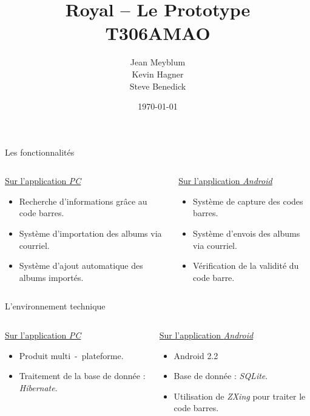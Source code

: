 \documentclass{beamer}
\title{Royal -- Le Prototype\\ T306AMAO}
\author[Jean, Kevin \& Steve]{Jean Meyblum \\ Kevin Hagner \\ Steve Benedick}
\institute{IUT Robert Schuman}
\date{\today}
\begin{document}
\begin{frame}
\titlepage
\end{frame} 

\begin{frame}{Les fonctionnalités}
\begin{columns}
\begin{column}[c]{5cm}
\underline{Sur l'application \emph{PC}}
\pause
\begin{itemize}
\pause \item Recherche d'informations grâce au code barres.
\pause \item Système d'importation des albums via courriel. 
\pause \item Système d'ajout automatique des albums importés.  
\end{itemize}
\end{column}

\begin{column}[c]{5cm}
\pause
\underline{Sur l'application \emph{Android}}
\begin{itemize}
\pause \item Système de capture des codes barres. 
\pause \item Système d'envois des albums via courriel.
\pause \item Vérification de la validité du code barre.
\end{itemize}

\end{column}
\end{columns}

\end{frame}

\begin{frame}{L'environnement technique}
\begin{columns}
\begin{column}[c]{5cm}
\pause
\underline{Sur l'application \emph{PC}}
\begin{itemize}
\pause \item Produit multi~-~plateforme.
\pause \item Traitement de la base de donnée : \emph{Hibernate}.
\end{itemize}
\end{column}

\pause 

\begin{column}[c]{5cm}
\underline{Sur l'application \emph{Android}} 
\begin{itemize}
\pause \item Android 2.2
\pause \item Base de donnée : \emph{SQLite}. 
\pause \item Utilisation de \emph{ZXing} pour traiter le code barres.
\end{itemize}
\end{column}
\end{columns}
\end{frame}
\end{document}
